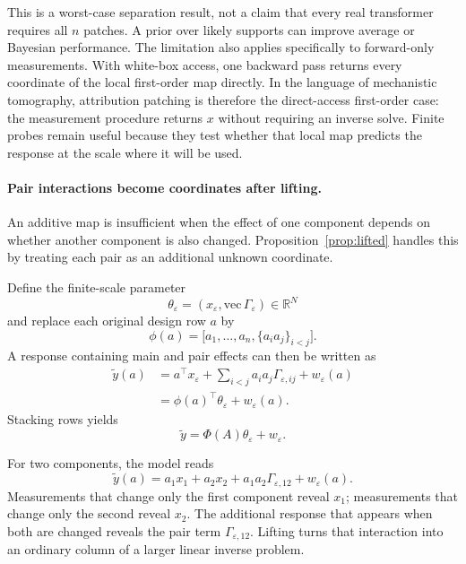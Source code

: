 \documentclass[sigconf,10pt,nonacm,balance=false]{acmart}
\newcommand{\eps}{\varepsilon}
\newcommand{\R}{\mathbb{R}}
\begin{document}
This is a worst-case separation result, not a claim that every real transformer requires all $n$ patches. A prior over likely supports can improve average or Bayesian performance. The limitation also applies specifically to forward-only measurements. With white-box access, one backward pass returns every coordinate of the local first-order map directly. In the language of mechanistic tomography, attribution patching is therefore the direct-access first-order case: the measurement procedure returns $x$ without requiring an inverse solve. Finite probes remain useful because they test whether that local map predicts the response at the scale where it will be used.

\paragraph{Pair interactions become coordinates after lifting.}
An additive map is insufficient when the effect of one component depends on whether another component is also changed. Proposition~\ref{prop:lifted} handles this by treating each pair as an additional unknown coordinate.

Define the finite-scale parameter
\begin{equation}
    \theta_\eps=(x_\eps,\mathrm{vec}\,\Gamma_\eps)\in\R^N
\end{equation}
and replace each original design row $a$ by
\begin{equation}
    \phi(a)=\big[a_1,\ldots,a_n,\{a_i a_j\}_{i<j}\big].
\end{equation}
A response containing main and pair effects can then be written as
\begin{equation}
\begin{aligned}
    \widetilde y(a)
    &=a^\top x_\eps+\sum_{i<j}a_i a_j\Gamma_{\eps,ij}+w_\eps(a)\\
    &=\phi(a)^\top\theta_\eps+w_\eps(a).
\end{aligned}
\end{equation}
Stacking rows yields
\begin{equation}
    \widetilde y=\Phi(A)\theta_\eps+w_\eps.
\end{equation}

For two components, the model reads
\[
    \widetilde y(a)
    =a_1x_1+a_2x_2+a_1a_2\Gamma_{\eps,12}+w_\eps(a).
\]
Measurements that change only the first component reveal $x_1$; measurements that change only the second reveal $x_2$. The additional response that appears when both are changed reveals the pair term $\Gamma_{\eps,12}$. Lifting turns that interaction into an ordinary column of a larger linear inverse problem.
\end{document}
